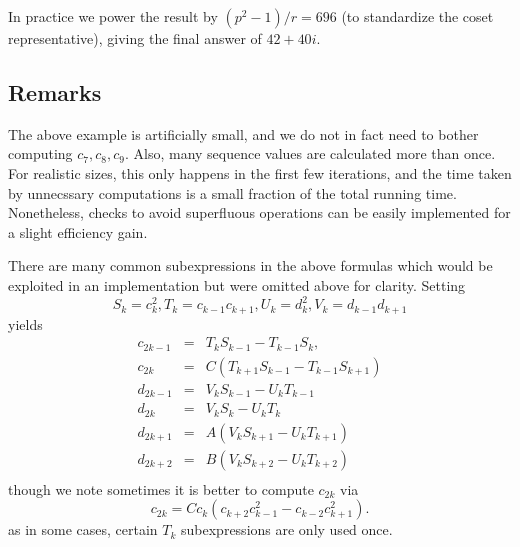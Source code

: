 In practice we power the result by
$(p^2 - 1)/r = 696$ (to standardize the coset representative),
giving the final answer of $42 + 40i$.

\subsection {Remarks}

The above example is artificially small, and we do not in fact need to bother
computing $c_7, c_8, c_9$. Also, many sequence values are calculated more than
once. For realistic sizes, this only happens in the first few iterations, and
the time taken by unnecssary computations is a small fraction of the total
running time. Nonetheless, checks to avoid superfluous operations can be easily
implemented for a slight efficiency gain.

There are many common subexpressions in the above formulas which would be
exploited in an implementation but were omitted above for clarity. Setting
\[
S_k = c_k^2, T_k = c_{k-1} c_{k+1}, U_k = d_k^2, V_k = d_{k-1}d_{k+1}
\]
yields
\[
\begin{array}{lcl}
    c_{2k-1} &=& T_k S_{k-1} - T_{k-1} S_k, \\
    c_{2k} &=& C(T_{k+1} S_{k-1} - T_{k-1} S_{k+1}) \\
    d_{2k-1} &=& V_k S_{k-1} - U_k T_{k-1} \\ 
    d_{2k} &=& V_k S_{k} - U_k T_k \\
    d_{2k+1} &=& A(V_k S_{k+1} - U_k T_{k+1}) \\
    d_{2k+2} &=& B(V_k S_{k+2} - U_k T_{k+2}) \\
\end{array}
\]
though we note sometimes it is better to compute $c_{2k}$ via
\[
    c_{2k} = C c_k (c_{k+2} c_{k-1}^2 - c_{k-2} c_{k+1}^2).
\]
as in some cases, certain $T_k$ subexpressions are only used once.
